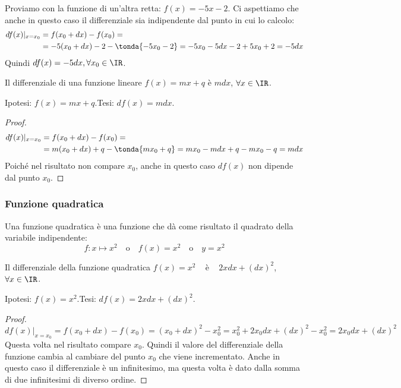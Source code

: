 \begin{esempio}
Proviamo con la funzione di un'altra retta: \(f(x) = -5x-2\). 
Ci aspettiamo che anche in questo caso il differenziale sia indipendente 
dal punto in cui lo calcolo:
\begin{align*}
df(x)|_{x=x_0} &=f(x_0+dx)-f(x_0)=\\
               &=-5(x_0+dx)-2-\tonda{-5x_0-2}=
                 -5x_0-5dx-2+5x_0+2=
                 -5dx
\end{align*}
Quindi $df(x)=-5dx, \forall x_0 \in \IR$. 
\end{esempio}

\begin{teorema}
 Il differenziale di una funzione lineare $f(x)=mx+q$ è $mdx$, 
 $\forall x\in \IR$.
\end{teorema}

\noindent Ipotesi: \(f(x)=mx+q\).\tab Tesi: \(df(x)=mdx\).

\begin{proof}
\begin{align*}
df(x)|_{x=x_0} &=f(x_0+dx)-f(x_0)=\\
               &=m(x_0+dx)+q-\tonda{mx_0+q}=
                 mx_0-mdx+q-mx_0-q=
                 mdx
\end{align*}
Poiché nel risultato non compare $x_0$, anche in questo caso $df(x)$ non 
dipende dal punto $x_0$.
\end{proof}

\subsubsection{Funzione quadratica}
\label{subsubsec:diff01_diffquad}

Una funzione quadratica è una funzione che dà come risultato il quadrato 
della variabile indipendente:
\[f: x \mapsto x^2 \quad \text{o} \quad 
  f(x)=x^2 \quad \text{o} \quad 
  y = x^2\]

\begin{teorema}
 Il differenziale della funzione quadratica $f(x)=x^2$ ~ è ~ $2xdx+(dx)^2$, 
~$\forall x\in \IR$.
\end{teorema}

\noindent Ipotesi: \(f(x)=x^2\).\tab Tesi: \(df(x)=2xdx+(dx)^2\).

\begin{proof}
\[
 df(x)|_{x=x_0}= 
f(x_0+dx)-f(x_0)=(x_0+dx)^2-x_0^2=x_0^2+2x_0dx+(dx)^2-x_0^2=2x_0dx+(dx)^2
\]
Questa volta nel risultato compare $x_0$. Quindi il valore del 
differenziale della funzione cambia al cambiare del punto $x_0$ che viene 
incrementato.
Anche in questo caso il differenziale è un infinitesimo, ma questa volta è 
dato dalla somma di due infinitesimi di diverso ordine.
\end{proof}

